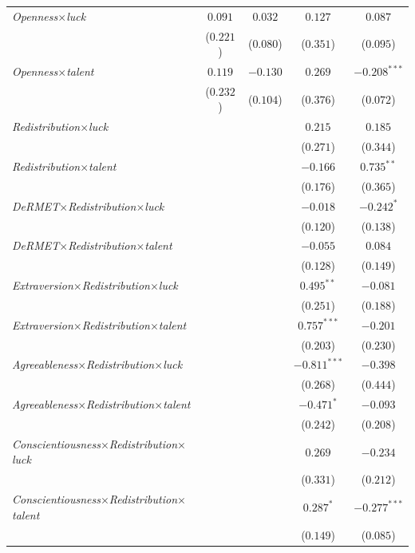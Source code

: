 \begin{footnotesize}
\begin{longtable}{l cc cc}
\textit{Openness}$\times$\textit{luck} & $0.091$ & $0.032$ & $0.127$ & $0.087$ \\
    & ($0.221$) & ($0.080$) & ($0.351$) & ($0.095$) \\
\textit{Openness}$\times$\textit{talent} & $0.119$ & $-0.130$ & $0.269$ & $-0.208^{***}$ \\
    & ($0.232$) & ($0.104$) & ($0.376$) & ($0.072$) \\
\textit{Redistribution}$\times$\textit{luck} &  &  & $0.215$ & $0.185$ \\
    &  &  & ($0.271$) & ($0.344$) \\
\textit{Redistribution}$\times$\textit{talent} &  &  & $-0.166$ & $0.735^{**}$ \\
    &  &  & ($0.176$) & ($0.365$) \\
\textit{DeRMET}$\times$\textit{Redistribution}$\times$\textit{luck} &  &  & $-0.018$ & $-0.242^{*}$ \\
    &  &  & ($0.120$) & ($0.138$) \\
\textit{DeRMET}$\times$\textit{Redistribution}$\times$\textit{talent} &  &  & $-0.055$ & $0.084$ \\
    &  &  & ($0.128$) & ($0.149$) \\
\textit{Extraversion}$\times$\textit{Redistribution}$\times$\textit{luck} &  &  & $0.495^{**}$ & $-0.081$ \\
    &  &  & ($0.251$) & ($0.188$) \\
\textit{Extraversion}$\times$\textit{Redistribution}$\times$\textit{talent} &  &  & $0.757^{***}$ & $-0.201$ \\
    &  &  & ($0.203$) & ($0.230$) \\
\textit{Agreeableness}$\times$\textit{Redistribution}$\times$\textit{luck} &  &  & $-0.811^{***}$ & $-0.398$ \\
    &  &  & ($0.268$) & ($0.444$) \\
\textit{Agreeableness}$\times$\textit{Redistribution}$\times$\textit{talent} &  &  & $-0.471^{*}$ & $-0.093$ \\
    &  &  & ($0.242$) & ($0.208$) \\
\textit{Conscientiousness}$\times$\textit{Redistribution}$\times$\textit{luck} &  &  & $0.269$ & $-0.234$ \\
    &  &  & ($0.331$) & ($0.212$) \\
\textit{Conscientiousness}$\times$\textit{Redistribution}$\times$\textit{talent} &  &  & $0.287^{*}$ & $-0.277^{***}$ \\
    &  &  & ($0.149$) & ($0.085$) \\

\end{longtable}
\end{footnotesize}
